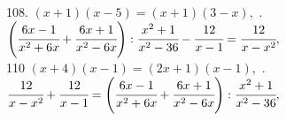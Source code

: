 108. $(x+1)(x-5)=(x+1)(3-x),$ . $\left(\cfrac{6x-1}{x^2+6x}+\cfrac{6x+1}{x^2-6x}\right):\cfrac{x^2+1}{x^2-36}-\cfrac{12}{x-1}=\cfrac{12}{x-x^2},$\\
110 $(x+4)(x-1)=(2x+1)(x-1),$ . $\cfrac{12}{x-x^2}+\cfrac{12}{x-1}=\left(\cfrac{6x-1}{x^2+6x}+\cfrac{6x+1}{x^2-6x}\right):\cfrac{x^2+1}{x^2-36},$\\
